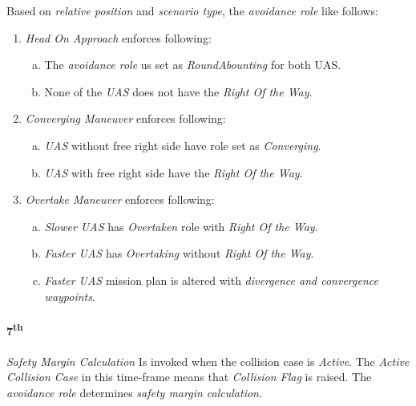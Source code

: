 \noindent Based on \emph{relative position} and \emph{scenario type}, the \emph{avoidance role} like follows:
\begin{enumerate}
    \item \emph{Head On Approach} enforces following:
    \begin{enumerate}[a.]
        \item The \emph{avoidance role} us set as \emph{RoundAbounting} for both UAS.
        
        \item None of the \emph{UAS} does not have the \emph{Right Of the Way}.
    \end{enumerate}
    
    \item \emph{Converging Maneuver} enforces following:
    \begin{enumerate}[a.]
        \item \emph{UAS} without free right side have role set as \emph{Converging}.
        
        \item \emph{UAS} with free right side have the \emph{Right Of the Way}.
    \end{enumerate}
    
    \item \emph{Overtake Maneuver}  enforces following:
    \begin{enumerate}[a.]
        \item \emph{Slower UAS} has \emph{Overtaken} role with \emph{Right Of the Way}.
        
        \item \emph{Faster UAS} has \emph{Overtaking} without 
        \emph{Right Of the Way}.
        
        \item \emph{Faster UAS} mission plan is altered with \emph{divergence and convergence waypoints}.
    \end{enumerate} 
\end{enumerate}

\paragraph{7\textsuperscript{th}} \emph{Safety Margin Calculation} Is invoked when the collision case is \emph{Active}. The \emph{Active Collision Case} in this time-frame means that \emph{Collision Flag} is raised. The \emph{avoidance role} determines \emph{safety margin calculation}.

